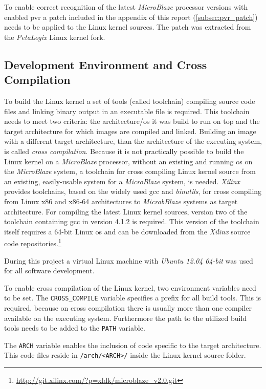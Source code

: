 To enable correct recognition of the latest \textit{MicroBlaze} processor versions with enabled \gls{pvr} a patch included in the appendix of this report (\ref{subsec:pvr_patch}) needs to be applied to the Linux kernel sources. The patch was extracted from the \textit{PetaLogix} Linux kernel fork.

\subsection{Development Environment and Cross Compilation}
\label{subsec:sdk}

To build the Linux kernel a set of tools (called toolchain) compiling source code files and linking binary output in an executable file is required. This toolchain needs to meet two criteria: the architecture/\gls{os} it was build to run on top and the target architecture for which images are compiled and linked. Building an image with a different target architecture, than the architecture of the executing system, is called \textit{cross compilation}. Because it is not practically possible to build the Linux kernel on a \textit{MicroBlaze} processor, without an existing and running \gls{os} on the \textit{MicroBlaze} system, a toolchain for cross compiling Linux kernel source from an existing, easily-usable system for a \textit{MicroBlaze} system, is needed. \textit{Xilinx} provides toolchains, based on the widely used \gls{gcc} and \textit{binutils}, for cross compiling from Linux x86 and x86-64 architectures to \textit{MicrobBlaze} systems as target architecture. For compiling the latest Linux kernel sources, version two of the toolchain containing \gls{gcc} in version 4.1.2 is required. This version of the toolchain itself requires a 64-bit Linux \gls{os} and can be downloaded from the \textit{Xilinx} source code repositories.\footnote{\url{http://git.xilinx.com/?p=xldk/microblaze_v2.0.git}}

During this project a virtual Linux machine with \textit{Ubuntu 12.04 64-bit} was used for all software development.

To enable cross compilation of the Linux kernel, two environment variables need to be set. The \texttt{CROSS\_COMPILE} variable specifies a prefix for all build tools. This is required, because on cross compilation there is usually more than one compiler available on the executing system. Furthermore the path to the utilized build tools needs to be added to the \texttt{PATH} variable.

The \texttt{ARCH} variable enables the inclusion of code specific to the target architecture. This code files reside in \texttt{/arch/<ARCH>/} inside the Linux kernel source folder. 


